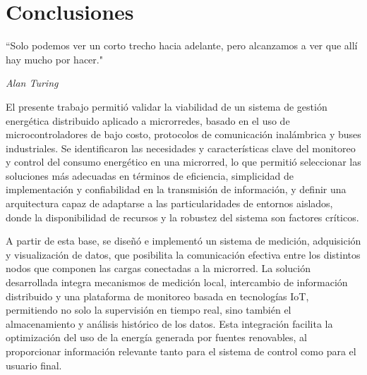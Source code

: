 \cleardoublepage 
\chapter{Conclusiones}
\label{cap:Conclusiones}
\epigraph{``Solo podemos ver un corto trecho hacia adelante, pero alcanzamos a
ver que allí hay mucho por hacer."}{\textit{Alan Turing}}




El presente trabajo permitió validar la viabilidad de un sistema de gestión energética distribuido aplicado a microrredes, basado en el uso de microcontroladores de bajo costo, protocolos de comunicación inalámbrica y buses industriales. Se identificaron las necesidades y características clave del monitoreo y control del consumo energético en una microrred, lo que permitió seleccionar las soluciones más adecuadas en términos de eficiencia, simplicidad de implementación y confiabilidad en la transmisión de información, y definir una arquitectura capaz de adaptarse a las particularidades de entornos aislados, donde la disponibilidad de recursos y la robustez del sistema son factores críticos.

A partir de esta base, se diseñó e implementó un sistema de medición, adquisición y visualización de datos, que posibilita la comunicación efectiva entre los distintos nodos que componen las cargas conectadas a la microrred. La solución desarrollada integra mecanismos de medición local, intercambio de información distribuido y una plataforma de monitoreo basada en tecnologías IoT, permitiendo no solo la supervisión en tiempo real, sino también el almacenamiento y análisis histórico de los datos. Esta integración facilita la optimización del uso de la energía generada por fuentes renovables, al proporcionar información relevante tanto para el sistema de control como para el usuario final.

